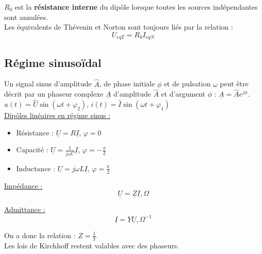 \documentclass[../main.tex]{subfiles}
\begin{document}
$R_0$ est la \textbf{résistance interne} du dipôle lorsque toutes les sources indépendantes sont annulées.\\

Les équivalents de Thévenin et Norton sont toujours liés par la relation : \begin{equation}
    U_{eqT} = R_0 I_{eqN}
\end{equation}

\subsection{Régime sinusoïdal}
Un signal sinus d'amplitude $\hat{A}$, de phase initiale $\phi$ et de pulsation $\omega$ peut être décrit par un phaseur complexe $\underline{A}$ d'amplitude $\hat{A}$ et d'argument $\phi$ : $\underline{A} = \hat{A}e^{j\phi}$.\\

$u(t) = \hat{U} \sin(\omega t+ \varphi_2)$, $i(t)= \hat{I} \sin(\omega t+ \varphi_1)$\\

\quad \underline{Dipôles linéaires en régime sinus :}\\
\begin{itemize}
    \item Résistance : $\underline{U} = R\underline{I}$, $\varphi=0$\\
    \item Capacité : $\underline{U} = \frac{1}{j\omega C}\underline{I}$, $\varphi = -\frac{\pi}{2}$\\
    \item Inductance : $\underline{U} = j\omega L \underline{I}$, $\varphi = \frac{\pi}{2}$\\
\end{itemize}

\quad \underline{Impédance :}\\
\begin{equation}
    \underline{U} = \underline{Z} \underline{I}, \Omega
\end{equation}

\quad \underline{Admittance :}\\
\begin{equation}
    \underline{I} = \underline{Y} \underline{U}, \Omega^{-1}
\end{equation}

On a donc la relation : $Z = \frac{1}{Y}$\\
Les lois de Kirchhoff restent valables avec des phaseurs. \\
\end{document}
